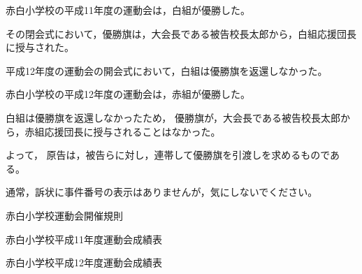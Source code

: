 \documentclass[a4paper,papersize,12pt]{jsarticle}
\begin{document}

\sectionC{}

赤白小学校の平成11年度の運動会は，白組が優勝した。

\sectionC{}

その閉会式において，優勝旗は，大会長である被告校長太郎から，白組応援団長に授与された。


\sectionC{}

平成12年度の運動会の開会式において，白組は優勝旗を返還しなかった。

\sectionC{}

赤白小学校の平成12年度の運動会は，赤組が優勝した。

\sectionC{}

白組は優勝旗を返還しなかったため，
優勝旗が，大会長である被告校長太郎から，赤組応援団長に授与されることはなかった。


よって，
原告は，被告らに対し，連帯して優勝旗を引渡しを求めるものである。


通常，訴状に事件番号の表示はありませんが，気にしないでください。


\sectionB*{}赤白小学校運動会開催規則

\sectionB*{}赤白小学校平成11年度運動会成績表

\sectionB*{}赤白小学校平成12年度運動会成績表



\sectionB*{}

\sectionB*{}

\sectionB*{}

\sectionB*{}
\end{document}
